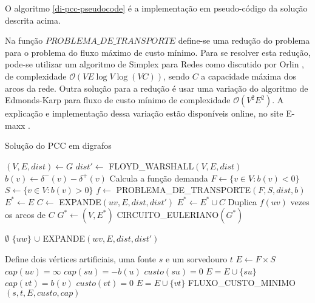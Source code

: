     O algoritmo \ref{di-pcc-pseudocode} é a implementação em pseudo-código da solução descrita acima.

    Na função $PROBLEMA\_DE\_TRANSPORTE$ define-se uma redução do problema para o problema do fluxo máximo de custo mínimo. 
    Para se resolver esta redução, pode-se utilizar um algoritmo de Simplex para Redes como discutido por Orlin \cite{network-simplex}, de complexidade $\mathcal{O}(VE\log V\log(VC))$, sendo $C$ a capacidade máxima dos arcos da rede. 
    Outra solução para a redução é usar uma variação do algoritmo de Edmonds-Karp \cite{edmonds-karp} para fluxo de custo mínimo de complexidade $\mathcal{O}(V^2E^2)$. 
    A explicação e implementação dessa variação estão disponíveis online, no site E-maxx \cite{min-cost}. 

    \begin{algorithm}
    \caption{Solução do PCC em digrafos}
    \label{di-pcc-pseudocode}
    \begin{algorithmic}[1]
    \State $(V, E, dist) \gets G$
    \State $dist' \gets $ FLOYD\_WARSHALL$(V, E, dist)$
        \State $b(v) \gets \delta^-(v) - \delta^+(v)$ \Comment Calcula a função demanda
    \EndFor
    \State $F \gets \{v \in V : b(v) < 0\}$
    \State $S \gets \{v \in V : b(v) > 0\}$
    \State $f \gets $ PROBLEMA\_DE\_TRANSPORTE$(F, S, dist, b)$
    \State $E^* \gets E$ 
        \State $C \gets$ EXPANDE$(uv, E, dist, dist')$
            \State $E^* \gets E^* \cup C$ \Comment Duplica $f(uv)$ vezes os arcos de $C$ 
        \EndFor
    \EndFor
    \State $G^* \gets (V, E^*)$
    \State \Return CIRCUITO\_EULERIANO$(G^*)$
    \EndFunction 

    \Return $\emptyset$
    \EndIf
        \State \Return $\{uw\}$  $\cup$ EXPANDE$(wv, E, dist, dist')$
        \EndIf
    \EndFor
    \EndFunction

        \State Define dois vértices artificiais, uma fonte $s$ e um sorvedouro $t$
        \State $E \gets F\times S$
            \State $cap(uv) = \infty$
        \EndFor
            \State $cap(su) = -b(u)$
            \State $custo(su) = 0$
            \State $E = E \cup \{su\}$
        \EndFor
            \State $cap(vt) = b(v)$
            \State $custo(vt) = 0$
            \State $E = E \cup \{vt\}$
        \EndFor
        \State \Return FLUXO\_CUSTO\_MINIMO$(s, t, E, custo, cap)$
    \EndFunction
    \end{algorithmic}
    \end{algorithm}

